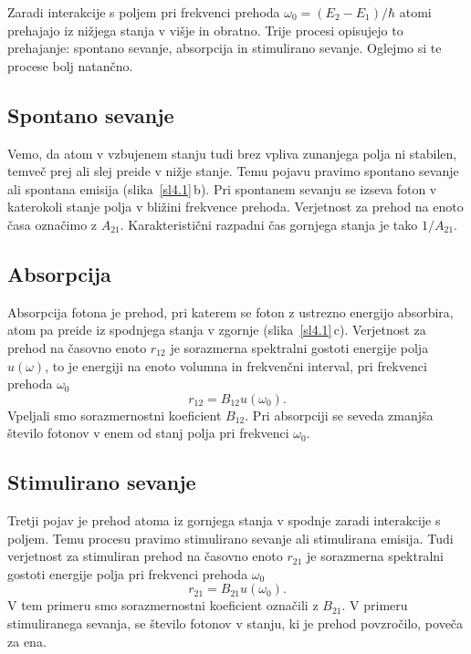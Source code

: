 Zaradi interakcije s poljem pri frekvenci prehoda $\omega_{0}=(E_{2}-E_{1})/\hbar$
atomi prehajajo iz nižjega stanja v višje in obratno. Trije procesi opisujejo to 
prehajanje: spontano sevanje, absorpcija in stimulirano sevanje. Oglejmo si te procese
bolj natančno.

\subsection*{Spontano sevanje}
Vemo, da atom v vzbujenem stanju tudi brez vpliva zunanjega polja
ni stabilen, temveč prej ali slej preide v nižje stanje. Temu pojavu
pravimo spontano sevanje ali spontana emisija (slika~\ref{sl4.1}\,b). 
Pri spontanem sevanju se izseva foton v katerokoli stanje polja v bližini 
frekvence prehoda. Verjetnost za prehod na enoto časa označimo z $A_{21}$.
Karakteristični razpadni čas gornjega stanja je tako
$1/A_{21}$.

\subsection*{Absorpcija}
Absorpcija fotona je prehod, pri katerem se foton 
z ustrezno energijo absorbira, atom pa preide iz spodnjega stanja v zgornje (slika~\ref{sl4.1}\,c). 
Verjetnost za prehod na časovno enoto $r_{12}$ je sorazmerna spektralni gostoti
energije polja $u(\omega)$, to je energiji na enoto volumna in frekvenčni interval, 
pri frekvenci prehoda $\omega_{0}$
\begin{equation}
r_{12}=B_{12}u(\omega_{0}).
\label{4.16}
\end{equation}
Vpeljali smo sorazmernostni koeficient $B_{12}$. Pri absorpciji se
seveda zmanjša število fotonov v enem od stanj polja pri frekvenci
$\omega_{0}$.

\subsection*{Stimulirano sevanje}
Tretji pojav je prehod atoma iz gornjega stanja v spodnje zaradi interakcije
s poljem. Temu procesu pravimo stimulirano sevanje ali 
stimulirana emisija. Tudi verjetnost za stimuliran prehod na časovno enoto $r_{21}$ 
je sorazmerna spektralni gostoti energije polja pri frekvenci prehoda $\omega_{0}$
\begin{equation}
r_{21}=B_{21}u(\omega_{0}).
\label{4.17}
\end{equation}
V tem primeru smo sorazmernostni koeficient označili z $B_{21}$. V primeru
stimuliranega sevanja, se število fotonov v stanju, ki je prehod povzročilo, poveča za ena. 


